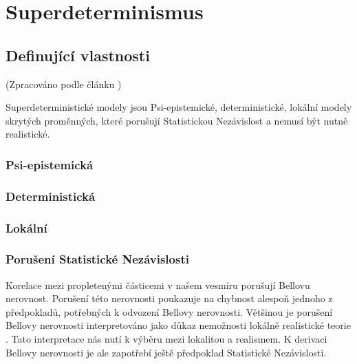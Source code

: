 \section{Superdeterminismus}
\subsection{Definující vlastnosti}
(Zpracováno podle článku \cite{supdet:rethink})

Superdeterministické modely jsou Psi-epistemické, deterministické, lokální modely skrytých proměnných, které porušují Statistickou Nezávislost a nemusí být nutně realistické.

\subsubsection{Psi-epistemická}

\subsubsection{Deterministická}

\subsubsection{Lokální}

\subsubsection{Porušení Statistické Nezávislosti}
Korelace mezi propletenými částicemi v našem vesmíru porušují Bellovu nerovnost. Porušení této nerovnosti poukazuje na chybnost alespoň jednoho z předpokladů, potřebných k odvození Bellovy nerovnosti. Většinou je porušení Bellovy nerovnosti interpretováno jako důkaz nemožnosti lokálně realistické teorie \parencite{belltest:violation}. Tato interpretace nás nutí k výběru mezi lokalitou a realismem. K derivaci Bellovy nerovnosti je ale zapotřebí ještě předpoklad Statistické Nezávislosti.